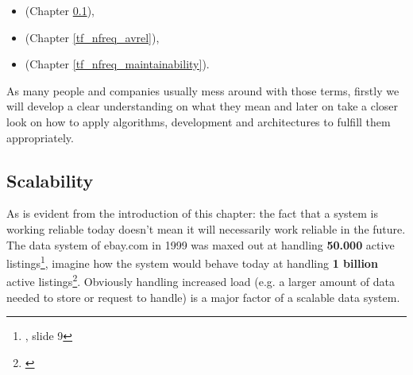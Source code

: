 \begin{itemize}
			\item {} (Chapter \ref{tf_nfreq_scalability}),
			\item {} (Chapter \ref{tf_nfreq_avrel}),
			\item {} (Chapter \ref{tf_nfreq_maintainability}).\\
\end{itemize}

As many people and companies usually mess around with those terms, firstly we will develop a clear understanding on what they mean and later on take a closer look on how to apply algorithms, development and architectures to fulfill them appropriately.

\subsection{Scalability}
\label{tf_nfreq_scalability}
As is evident from the introduction of this chapter: the fact that a system is working reliable today doesn't mean it will necessarily work reliable in the future. The data system of ebay.com in 1999 was maxed out at handling \textbf{50.000} active listings\footnote{\cite{EBAYA}, slide 9}, imagine how the system would behave today at handling \textbf{1 billion} active listings\footnote{\cite{EBAYHP}}.
Obviously handling increased load (e.g. a larger amount of data needed to store or request to handle) is a major factor of a scalable data system.
\\[0.5 cm]
\hspace*{4mm}%
